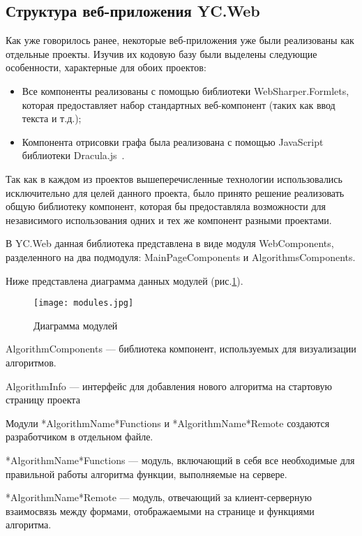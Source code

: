 \documentclass[14pt]{matmex-diploma-custom}
\begin{document}
\newpage
\subsection{Структура веб-приложения YC.Web}

Как уже говорилось ранее, некоторые веб-приложения уже были реализованы как отдельные проекты. Изучив их кодовую базу были выделены следующие особенности, характерные для обоих проектов:

\begin{itemize}
    \item Все компоненты реализованы с помощью библиотеки 
    \linebreak WebSharper.Formlets, которая предоставляет набор стандартных веб-компонент (таких как ввод текста и т.д.);
    \item Компонента отрисовки графа была реализована с помощью JavaScript библиотеки Dracula.js~\cite{dracula}.
\end{itemize}


Так как в каждом из проектов вышеперечисленные технологии использовались исключительно для целей данного проекта, было принято решение реализовать общую библиотеку компонент, которая бы предоставляла возможности для независимого использования одних и тех же компонент разными проектами.

В YC.Web данная библиотека представлена в виде модуля \linebreak WebComponents, разделенного на два подмодуля: MainPageComponents и AlgorithmsComponents. 	

Ниже представлена диаграмма данных модулей (рис.\ref{pic3}).

\newpage

\begin{figure}[h]
\centering
\texttt{[image: modules.jpg]}
\caption{Диаграмма модулей}
\label{pic3}
\end{figure}

AlgorithmComponents --- библиотека компонент, используемых для  визуализации алгоритмов.

AlgorithmInfo --- интерфейс для добавления нового алгоритма на стартовую страницу проекта

Модули *AlgorithmName*Functions и *AlgorithmName*Remote создаются разработчиком в отдельном файле.

*AlgorithmName*Functions --- модуль, включающий в себя все необходимые для правильной работы алгоритма функции, выполняемые на сервере.

*AlgorithmName*Remote --- модуль, отвечающий за клиент-серверную взаимосвязь между формами, отображаемыми на странице и функциями алгоритма.
\end{document}
